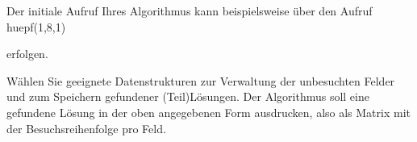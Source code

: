 \documentclass{lehramt-informatik-aufgabe}
\begin{document}
Der initiale Aufruf Ihres Algorithmus kann beispielsweise über den Aufruf
huepf(1,8,1)

erfolgen.

Wählen Sie geeignete Datenstrukturen zur Verwaltung der unbesuchten
Felder und zum Speichern gefundener (Teil)Lösungen. Der Algorithmus soll
eine gefundene Lösung in der oben angegebenen Form ausdrucken, also als
Matrix mit der Besuchsreihenfolge pro Feld.
\end{document}

